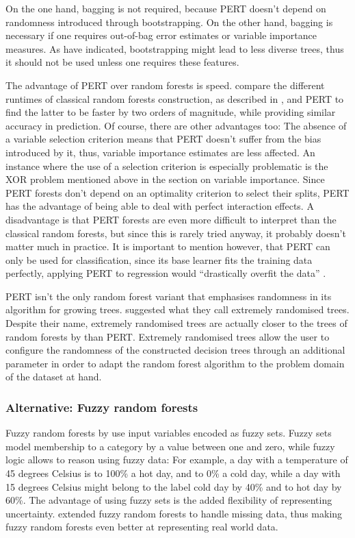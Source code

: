 \documentclass[a4paper,man,12pt,apacite,floatsintext,draftfirst]{apa6} %
\begin{document}
On the one hand, bagging is not required, because PERT doesn't depend on
randomness introduced through bootstrapping.
On the other hand, bagging is necessary if one requires out-of-bag
error estimates or variable importance measures.
As \cite{liu2005maximizing} have indicated, bootstrapping might lead
to less diverse trees, thus it should not be used unless one requires
these features.

The advantage of PERT over random forests is speed.
\cite{cutler2001pert} compare the different runtimes of classical random
forests construction, as described in \cite{breiman2001random}, and PERT
to find the latter to be faster by two orders of magnitude,
while providing similar accuracy in prediction.
Of course, there are other advantages too:
The absence of a variable selection criterion means that PERT doesn't suffer
from the bias introduced by it, thus, variable importance estimates are less
affected.
An instance where the use of a selection criterion is especially problematic
is the XOR problem mentioned above in the section on variable importance.
Since PERT forests don't depend on an optimality criterion to select their
splits, PERT has the advantage of being able to deal with perfect
interaction effects.
A disadvantage is that PERT forests are even more difficult to interpret than
the classical random forests, but since this is rarely tried anyway,
it probably doesn't matter much in practice.
It is important to mention however, that PERT can only be used for
classification,
since its base learner fits the training data perfectly, applying PERT to
regression would “drastically overfit the data” \cite{cutler2001pert}.

PERT isn't the only random forest variant that emphasises randomness in its
algorithm for growing trees.
\cite{geurts2006extremely} suggested what they call extremely randomised trees.
Despite their name, extremely randomised trees are actually closer to the
trees of random forests by \cite{breiman2001random} than PERT.
Extremely randomised trees allow the user to configure the randomness of the
constructed decision trees through an additional parameter in order to adapt
the random forest algorithm to the problem domain of the dataset at hand.

\subsubsection{Alternative: Fuzzy random forests}
Fuzzy random forests by \cite{bonissone2008fuzzy} use input variables
encoded as fuzzy sets.
Fuzzy sets \cite{wpFS} model membership to a category by a value between
one and zero, while fuzzy logic \cite{wpFL} allows to reason using fuzzy data:
For example, a day with a temperature of 45 degrees Celsius is to 100\% a
hot day, and to 0\% a cold day, while a day with 15 degrees Celsius might
belong to the label cold day by 40\% and to hot day by 60\%.
The advantage of using fuzzy sets is the added flexibility of representing
uncertainty.
\cite{cadenas2012extending} extended fuzzy random forests to handle
missing data, thus making fuzzy random forests even better at representing
real world data.
\end{document}
